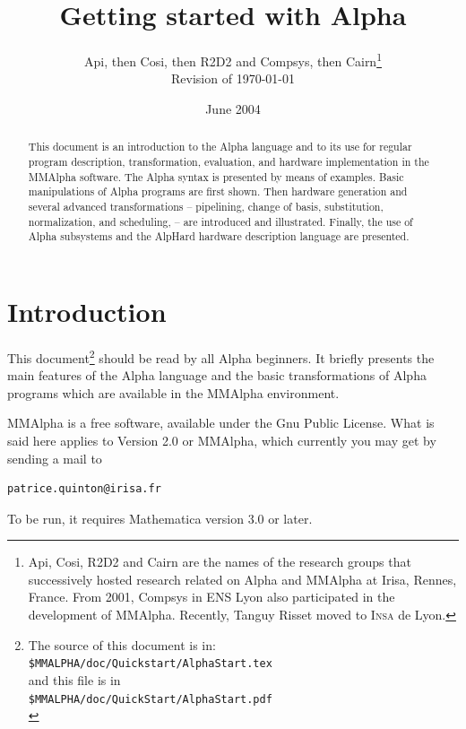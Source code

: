 \documentclass[12pt]{article}
\newcommand{\gpl}{Gnu Public License}
\newcommand{\Alpha}{{\sc Alpha}}
\newcommand{\AlpHard}{{\sc AlpHard}}
\newcommand{\MMA}{{\sc MMAlpha}}
\newcommand{\alfa}{\Alpha}
\newcommand{\mmalfa}{\MMA}
\newcommand{\mmalpha}{\MMA}
\newcommand{\mma}{{Mathematica}}
\begin{document}
\title{Getting started with \Alpha{}}
\author{Api, then Cosi, then R2D2 and Compsys, then Cairn\thanks{
Api, Cosi, R2D2 and Cairn are the names of the 
research groups that successively hosted
research related on \alfa{} and \mmalpha{} at Irisa, Rennes, France. 
From 2001, Compsys in ENS Lyon also participated in 
the development of \mmalpha{}. Recently, Tanguy Risset moved to \textsc{Insa} de Lyon.}
\\Revision of \today{}}
\date{June 2004}
\maketitle

\begin{abstract}
This document is an introduction to the \alfa{} language
and to its use for regular program description, transformation, 
evaluation, and hardware implementation in the \mmalfa{} 
software. The \alfa{} syntax is presented by means of examples. 
Basic manipulations of \alfa{} programs are first shown. 
Then hardware generation and 
several advanced 
transformations -- pipelining, change of basis, substitution, 
normalization, and 
scheduling, -- are introduced and illustrated. 
Finally, the use of \alfa{} subsystems and the \AlpHard{}
hardware description language are presented.
\end{abstract}

\section{Introduction}
\label{intro}
This document\footnote{The source of this document is in:\\
\texttt{\$MMALPHA/doc/Quickstart/AlphaStart.tex}\\
and this file is in\\
\texttt{\$MMALPHA/doc/QuickStart/AlphaStart.pdf}\\
} should be read by all \alfa{} beginners.
It briefly presents the main features of the \alfa{} language and
the basic transformations of \alfa{} programs which are 
available in the \mmalfa{} environment.

\mmalfa{} is a free software, available under the 
\gpl{}. 
What is said here applies to Version 2.0 or \mmalfa{}, 
which currently you may get by sending a mail to 
\begin{verbatim}
patrice.quinton@irisa.fr
\end{verbatim}
To be run, it requires
\mma{} version 3.0 or later.
\end{document}
